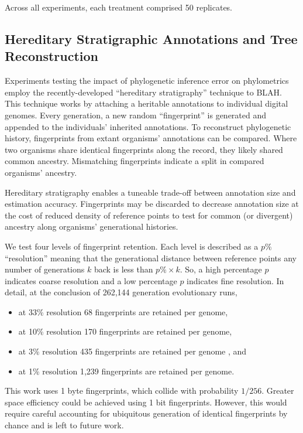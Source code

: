 Across all experiments, each treatment comprised 50 replicates.

\subsection{Hereditary Stratigraphic Annotations and Tree Reconstruction}

Experiments testing the impact of phylogenetic inference error on phylometrics employ the recently-developed ``hereditary stratigraphy'' technique to BLAH. 
This technique works by attaching a heritable annotations to individual digital genomes.
Every generation, a new random ``fingerprint'' is generated and appended to the individuals' inherited annotations.
To reconstruct phylogenetic history, fingerprints from extant organisms' annotations can be compared.
Where two organisms share identical fingerprints along the record, they likely shared common ancestry.
Mismatching fingerprints indicate a split in compared organisms' ancestry.

Hereditary stratigraphy enables a tuneable trade-off between annotation size and estimation accuracy.
Fingerprints may be discarded to decrease annotation size at the cost of reduced density of reference points to test for common (or divergent) ancestry along organisms' generational histories.

We test four levels of fingerprint retention.
Each level is described as a $p\%$ ``resolution''  meaning that the generational distance between reference points any number of generations $k$ back is less than $p\% \times  k$.
So, a high percentage $p$ indicates coarse resolution and a low percentage $p$ indicates fine resolution.
In detail, at the conclusion of 262,144 generation evolutionary runs,
\begin{itemize}
    \item at 33\% resolution 68 fingerprints are retained per genome,
    \item at 10\% resolution 170 fingerprints are retained per genome,
    \item at 3\% resolution 435 fingerprints are retained per genome , and
    \item at 1\% resolution 1,239 fingerprints are retained per genome.
\end{itemize}

This work uses 1 byte fingerprints, which collide with probability $1/256$. 
Greater space efficiency could be achieved using 1 bit fingerprints.
However, this would require careful accounting for ubiquitous generation of  identical fingerprints by chance and is left to future work. 


